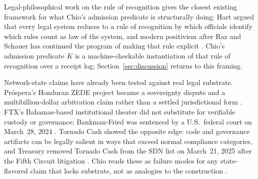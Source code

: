 Legal-philosophical work on the rule of recognition gives the closest existing framework for what Chio's admission predicate is structurally doing: Hart argued that every legal system reduces to a rule of recognition by which officials identify which rules count as law of the system, and modern positivism after Raz and Schauer has continued the program of making that rule explicit \cite{hartLaw,razAuthority,schauerRules}. Chio's admission predicate $K$ is a machine-checkable instantiation of that rule of recognition over a receipt log; Section~\ref{sec:discussion} returns to this framing.

Network-state claims have already been tested against real legal substrate. Próspera's Honduran ZEDE project became a sovereignty dispute and a multibillion-dollar arbitration claim rather than a settled jurisdictional form \cite{prosperaIcsid,reutersZede}. FTX's Bahamas-based institutional theater did not substitute for verifiable custody or governance; Bankman-Fried was sentenced by a U.S.\ federal court on March~28, 2024 \cite{dojSbf}. Tornado Cash showed the opposite edge: code and governance artifacts can be legally salient in ways that exceed normal compliance categories, and Treasury removed Tornado Cash from the SDN list on March~21, 2025 after the Fifth Circuit litigation \cite{treasuryTornadoDelist,vanLoon}. Chio reads these as failure modes for any state-flavored claim that lacks substrate, not as analogies to the construction \cite{srinivasanNetworkState}.
